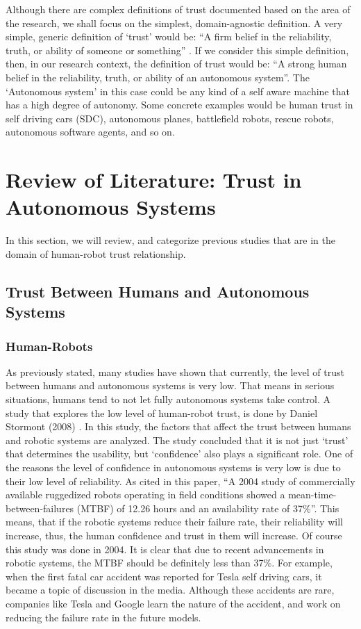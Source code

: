 \documentclass[runningheads,a4paper]{llncs}
\begin{document}
Although there are complex definitions of trust documented based on the area of the research,  we shall focus on the simplest, domain-agnostic definition. A very simple, generic definition of `trust' would be: ``A firm belief in the reliability, truth, or ability of someone or something'' \cite{oxfordDicTrust}. If we consider this simple definition, then, in our research context, the definition of trust would be: ``A strong human belief in the reliability, truth, or ability of an autonomous system''. The `Autonomous system' in this case could be any kind of a self aware machine that has a high degree of autonomy. Some concrete examples would be human trust in self driving cars (SDC), autonomous planes, battlefield robots, rescue robots, autonomous software agents, and so on.

\section{Review of Literature: Trust in Autonomous Systems}
In this section, we will review, and categorize previous studies that are in the domain of human-robot trust relationship.

\subsection{Trust Between Humans and Autonomous Systems}

\subsubsection{Human-Robots}
As previously stated, many studies have shown that currently, the level of trust between humans and autonomous systems is very low. That means in serious situations, humans tend to not let fully autonomous systems take control. A study that explores the low level of human-robot trust, is done by Daniel Stormont (2008) \cite{stormont2008analyzing}. In this study, the factors that affect the trust between humans and robotic systems are analyzed. The study concluded that it is not just `trust' that determines the usability, but `confidence' also plays a significant role. One of the reasons the level of confidence in autonomous systems is very low is due to their low level of reliability. As cited in this paper, ``A 2004 study of commercially available ruggedized robots operating in
field conditions showed a mean-time-between-failures
(MTBF) of 12.26 hours and an availability rate of 37\%''\cite{carlson2004investigation}. This means, that if the robotic systems reduce their failure rate, their reliability will increase, thus, the human confidence and trust in them will increase. Of course this study was done in 2004. It is clear that due to recent advancements in robotic systems, the MTBF should be definitely less than 37\%. For example, when the first fatal car accident was reported for Tesla self driving cars, it became a topic of discussion in the media. Although these accidents are rare, companies like Tesla and Google learn the nature of the accident, and work on reducing the failure rate in the future models. \cite{TeslaFatalAccident}
\end{document}

